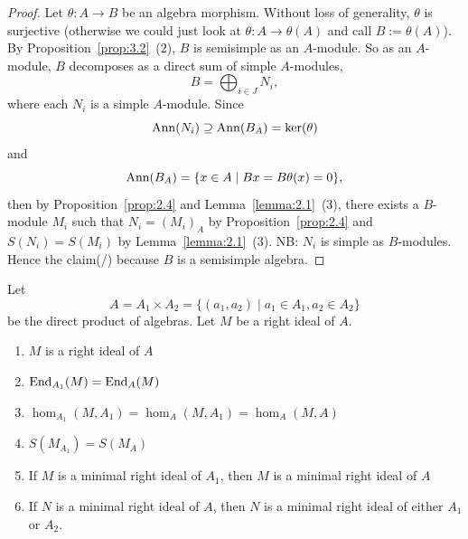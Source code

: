 \begin{proof}
Let $\theta\colon A\to B$ be an algebra morphism. Without loss of
generality, $\theta$ is surjective (otherwise we could just look at
$\theta\colon A\to\theta(A)$ and call $B:=\theta(A)$). By
Proposition~\ref{prop:3.2}~(2), $B$ is semisimple as an $A$-module. So
as an $A$-module, $B$ decomposes as a direct sum of simple
$A$-modules,
\begin{equation}
B=\bigoplus_{i\in J}N_{i},
\end{equation}
where each $N_{i}$ is a simple $A$-module. Since 
\begin{equation}
\operatorname{Ann}(N_{i})\supseteq\operatorname{Ann}(B_{A})=\ker(\theta)
\end{equation}
and
\begin{equation}
\operatorname{Ann}(B_{A})=\{x\in A\mid Bx=B\theta(x)=0\},
\end{equation}
then by Proposition~\ref{prop:2.4} and Lemma~\ref{lemma:2.1}~(3),
there exists a $B$-module $M_{i}$ such that $N_{i}=(M_{i})_{A}$ by
Proposition~\ref{prop:2.4} and $S(N_{i})=S(M_{i})$ by Lemma~\ref{lemma:2.1}~(3).
NB: $N_{i}$ is simple as $B$-modules. Hence the claim(/) because $B$
is a semisimple algebra.
\end{proof}

\begin{lemma}\label{lemma:3.4}
Let 
\begin{equation}
A=A_{1}\times A_{2}=\{(a_{1},a_{2})\mid a_{1}\in A_{1},a_{2}\in A_{2}\}
\end{equation}
be the direct product of algebras. Let $M$ be a right ideal of $A$.
\begin{enumerate}
\item $M$ is a right ideal of $A$
\item $\operatorname{End}_{A_{1}}(M)=\operatorname{End}_{A}(M)$
\item $\hom_{A_{1}}(M,A_{1})=\hom_{A}(M,A_{1})=\hom_{A}(M,A)$
\item $S(M_{A_{1}})=S(M_{A})$
\item If $M$ is a minimal right ideal of $A_{1}$, then $M$ is a
  minimal right ideal of $A$
\item If $N$ is a minimal right ideal of $A$, then $N$ is a minimal
  right ideal of either $A_{1}$ or $A_{2}$.
\end{enumerate}
\end{lemma}

